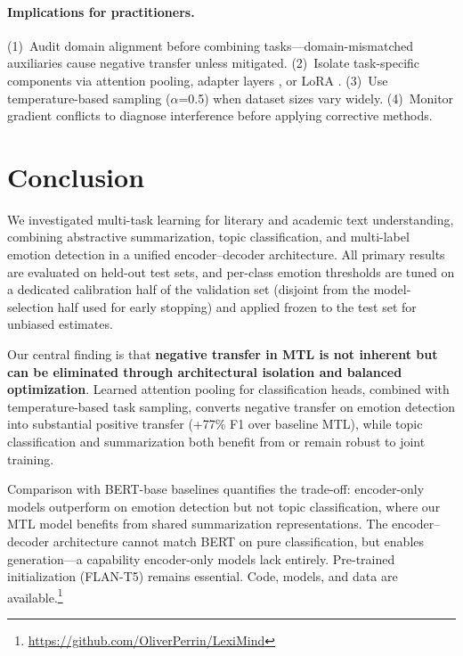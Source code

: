 \documentclass[11pt]{article}
\begin{document}
\paragraph{Implications for practitioners.} (1)~Audit domain alignment before combining tasks---domain-mismatched auxiliaries cause negative transfer unless mitigated. (2)~Isolate task-specific components via attention pooling, adapter layers \citep{houlsby2019parameter}, or LoRA \citep{hu2022lora}. (3)~Use temperature-based sampling ($\alpha$=0.5) when dataset sizes vary widely. (4)~Monitor gradient conflicts to diagnose interference before applying corrective methods.

\section{Conclusion}

We investigated multi-task learning for literary and academic text understanding, combining abstractive summarization, topic classification, and multi-label emotion detection in a unified encoder--decoder architecture. All primary results are evaluated on held-out test sets, and per-class emotion thresholds are tuned on a dedicated calibration half of the validation set (disjoint from the model-selection half used for early stopping) and applied frozen to the test set for unbiased estimates.

Our central finding is that \textbf{negative transfer in MTL is not inherent but can be eliminated through architectural isolation and balanced optimization}. Learned attention pooling for classification heads, combined with temperature-based task sampling, converts negative transfer on emotion detection into substantial positive transfer (+77\% F1 over baseline MTL), while topic classification and summarization both benefit from or remain robust to joint training.

Comparison with BERT-base baselines quantifies the trade-off: encoder-only models outperform on emotion detection but not topic classification, where our MTL model benefits from shared summarization representations. The encoder--decoder architecture cannot match BERT on pure classification, but enables generation---a capability encoder-only models lack entirely. Pre-trained initialization (FLAN-T5) remains essential. Code, models, and data are available.\footnote{\url{https://github.com/OliverPerrin/LexiMind}}
\end{document}
